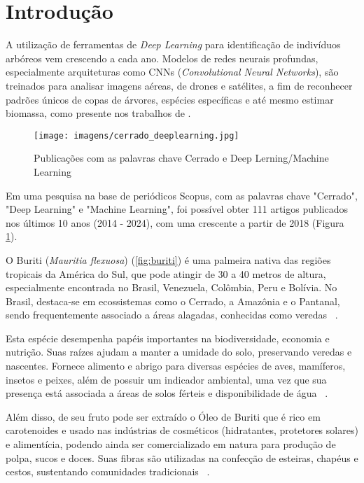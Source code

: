 \section{Introdução}
\label{sec:intro}

A utilização de ferramentas de \textit{Deep Learning} para identificação de indivíduos arbóreos vem crescendo a cada ano. Modelos de redes neurais profundas, especialmente arquiteturas como CNNs (\textit{Convolutional Neural Networks}), são treinados para analisar imagens aéreas, de drones e satélites, a fim de reconhecer padrões únicos de copas de árvores, espécies específicas e até mesmo estimar biomassa, como presente nos trabalhos de \cite{huang2024tree, gevaert2024explainable, hiraguri2023shape}.

\begin{figure}[H]
    \centering
    \texttt{[image: imagens/cerrado\_deeplearning.jpg]}
    \caption{Publicações com as palavras chave Cerrado e Deep Lerning/Machine Learning}
    \label{fig:scopus}
\end{figure}

Em uma pesquisa na base de periódicos Scopus, com as palavras chave "Cerrado", "Deep Learning" e "Machine Learning", foi possível obter 111 artigos publicados nos últimos 10 anos (2014 - 2024), com uma crescente a partir de 2018 (Figura \ref{fig:scopus}).


O Buriti (\textit{Mauritia flexuosa}) (\ref{fig:buriti}) é uma palmeira nativa das regiões tropicais da América do Sul, que pode atingir de 30 a 40 metros de altura, especialmente encontrada no Brasil, Venezuela, Colômbia, Peru e Bolívia. No Brasil, destaca-se em ecossistemas como o Cerrado, a Amazônia e o Pantanal, sendo frequentemente associado a áreas alagadas, conhecidas como veredas ~\cite{buriti1}.

Esta espécie desempenha papéis importantes na biodiversidade, economia e nutrição. Suas raízes ajudam a manter a umidade do solo, preservando veredas e nascentes. Fornece alimento e abrigo para diversas espécies de aves, mamíferos, insetos e peixes, além de possuir um indicador ambiental, uma vez que sua presença está associada a áreas de solos férteis e disponibilidade de água ~\cite{buriti2}. 

Além disso, de seu fruto pode ser extraído o Óleo de Buriti que é rico em carotenoides e usado nas indústrias de cosméticos (hidratantes, protetores solares) e alimentícia, podendo ainda ser comercializado em natura para produção de polpa, sucos e doces. Suas fibras são utilizadas na confecção de esteiras, chapéus e cestos, sustentando comunidades tradicionais ~\cite{florabrasileira}.


